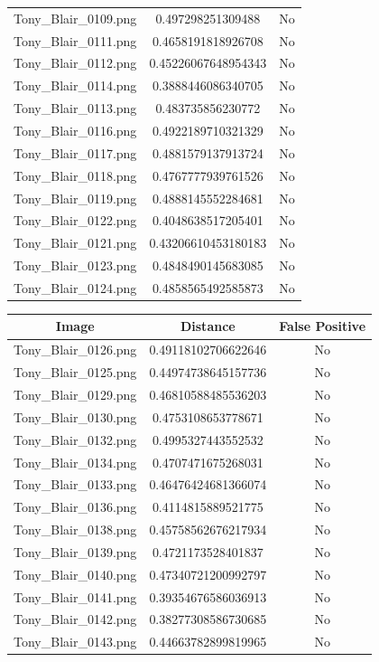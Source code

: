 \documentclass[12pt]{article}
\begin{document}
\begin{center}
\begin{tabular}{ccc}
Tony\_Blair\_0109.png & 0.497298251309488 & No\\
Tony\_Blair\_0111.png & 0.4658191818926708 & No\\
Tony\_Blair\_0112.png & 0.45226067648954343 & No\\
Tony\_Blair\_0114.png & 0.3888446086340705 & No\\
Tony\_Blair\_0113.png & 0.483735856230772 & No\\
Tony\_Blair\_0116.png & 0.4922189710321329 & No\\
Tony\_Blair\_0117.png & 0.4881579137913724 & No\\
Tony\_Blair\_0118.png & 0.4767777939761526 & No\\
Tony\_Blair\_0119.png & 0.4888145552284681 & No\\
Tony\_Blair\_0122.png & 0.4048638517205401 & No\\
Tony\_Blair\_0121.png & 0.43206610453180183 & No\\
Tony\_Blair\_0123.png & 0.4848490145683085 & No\\
Tony\_Blair\_0124.png & 0.4858565492585873 & No\\
\end{tabular}

\newpage
\begin{tabular}{ccc}
Image & Distance & False Positive \\
\hline
Tony\_Blair\_0126.png & 0.49118102706622646 & No\\
Tony\_Blair\_0125.png & 0.44974738645157736 & No\\
Tony\_Blair\_0129.png & 0.46810588485536203 & No\\
Tony\_Blair\_0130.png & 0.4753108653778671 & No\\
Tony\_Blair\_0132.png & 0.4995327443552532 & No\\
Tony\_Blair\_0134.png & 0.4707471675268031 & No\\
Tony\_Blair\_0133.png & 0.46476424681366074 & No\\
Tony\_Blair\_0136.png & 0.4114815889521775 & No\\
Tony\_Blair\_0138.png & 0.45758562676217934 & No\\
Tony\_Blair\_0139.png & 0.4721173528401837 & No\\
Tony\_Blair\_0140.png & 0.47340721200992797 & No\\
Tony\_Blair\_0141.png & 0.39354676586036913 & No\\
Tony\_Blair\_0142.png & 0.38277308586730685 & No\\
Tony\_Blair\_0143.png & 0.44663782899819965 & No\\
\end{tabular}
\end{center}
\end{document}
